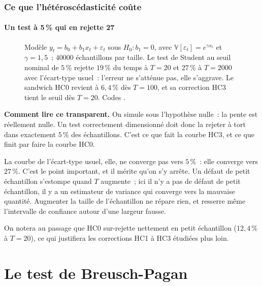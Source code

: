 \documentclass[10pt]{beamer}
\begin{document}
\begin{frame}[c]
  \frametitle{Ce que l'hétéroscédasticité coûte}
  \framesubtitle{Un test à 5\,\% qui en rejette 27}

  \begin{figure}
    \centering
    \scalebox{.42}{}
    \caption{Modèle $y_t = b_0 + b_1x_t + \varepsilon_t$ sous $H_0: b_1=0$, avec
      $\mathbb V[\varepsilon_t] = e^{\gamma x_t}$ et $\gamma=1{,}5$~; $40000$
      échantillons par taille. Le test de Student au seuil nominal de $5\,\%$
      rejette $19\,\%$ du temps à $T=20$ et $27\,\%$ à $T=2000$ avec l'écart-type
      usuel~: l'erreur ne s'atténue pas, elle s'aggrave. Le sandwich HC0 revient
      à $6{,}4\,\%$ dès $T=100$, et sa correction HC3 tient le seuil dès $T=20$.
      Codes .}
  \end{figure}

\end{frame}


\begin{notes}

  \textbf{Comment lire ce transparent.} On simule sous l'hypothèse nulle~: la
  pente est réellement nulle. Un test correctement dimensionné doit donc la
  rejeter à tort dans exactement $5\,\%$ des échantillons. C'est ce que fait la
  courbe HC3, et ce que finit par faire la courbe HC0.

  \bigskip

  La courbe de l'écart-type usuel, elle, ne converge pas vers $5\,\%$~: elle
  converge vers $27\,\%$. C'est le point important, et il mérite qu'on s'y
  arrête. Un défaut de petit échantillon s'estompe quand $T$ augmente~; ici il
  n'y a pas de défaut de petit échantillon, il y a un estimateur de variance qui
  converge vers la mauvaise quantité. Augmenter la taille de l'échantillon ne
  répare rien, et resserre même l'intervalle de confiance autour d'une largeur
  fausse.

  \bigskip

  On notera au passage que HC0 sur-rejette nettement en petit échantillon
  ($12{,}4\,\%$ à $T=20$), ce qui justifiera les corrections HC1 à HC3
  étudiées plus loin.

\end{notes}


\section{Le test de Breusch-Pagan}
\end{document}
